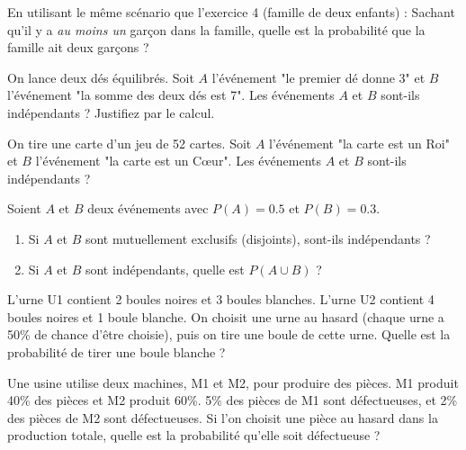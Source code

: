 \begin{exercicebox}
En utilisant le même scénario que l'exercice 4 (famille de deux enfants) :
Sachant qu'il y a \textit{au moins un} garçon dans la famille, quelle est la probabilité que la famille ait deux garçons ?
\end{exercicebox}


\begin{exercicebox}
On lance deux dés équilibrés.
Soit $A$ l'événement "le premier dé donne 3" et $B$ l'événement "la somme des deux dés est 7".
Les événements $A$ et $B$ sont-ils indépendants ? Justifiez par le calcul.
\end{exercicebox}

\begin{exercicebox}
On tire une carte d'un jeu de 52 cartes.
Soit $A$ l'événement "la carte est un Roi" et $B$ l'événement "la carte est un Cœur".
Les événements $A$ et $B$ sont-ils indépendants ?
\end{exercicebox}

\begin{exercicebox}
Soient $A$ et $B$ deux événements avec $P(A)=0.5$ et $P(B)=0.3$.
\begin{enumerate}
    \item Si $A$ et $B$ sont mutuellement exclusifs (disjoints), sont-ils indépendants ?
    \item Si $A$ et $B$ sont indépendants, quelle est $P(A \cup B)$ ?
\end{enumerate}
\end{exercicebox}


\begin{exercicebox}
L'urne U1 contient 2 boules noires et 3 boules blanches. L'urne U2 contient 4 boules noires et 1 boule blanche.
On choisit une urne au hasard (chaque urne a 50\% de chance d'être choisie), puis on tire une boule de cette urne.
Quelle est la probabilité de tirer une boule blanche ?
\end{exercicebox}

\begin{exercicebox}
Une usine utilise deux machines, M1 et M2, pour produire des pièces. M1 produit 40\% des pièces et M2 produit 60\%. 5\% des pièces de M1 sont défectueuses, et 2\% des pièces de M2 sont défectueuses.
Si l'on choisit une pièce au hasard dans la production totale, quelle est la probabilité qu'elle soit défectueuse ?
\end{exercicebox}

